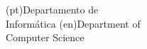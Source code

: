




\ntdepartment(pt){Departamento de\\Informática}
\ntdepartment(en){Department of\\Computer Science}









